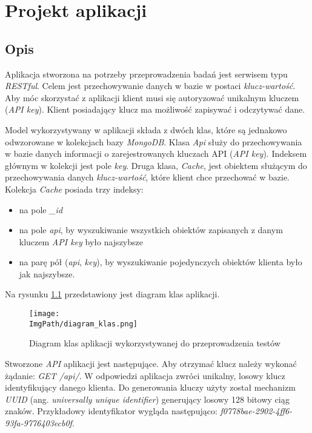 \chapter{Projekt aplikacji}
\section{Opis}
Aplikacja stworzona na potrzeby przeprowadzenia badań jest serwisem typu \textsl{RESTful}. Celem jest przechowywanie danych w bazie w postaci \textsl{klucz-wartość}. Aby móc skorzystać z aplikacji klient musi się autoryzować unikalnym kluczem (\textsl{API key}). Klient posiadający klucz ma możliwość zapisywać i odczytywać dane. 

Model wykorzystywany w aplikacji składa z dwóch klas, które są jednakowo odwzorowane w kolekcjach bazy \textsl{MongoDB}. Klasa \textsl{Api} służy do przechowywania w bazie danych informacji o zarejestrowanych kluczach API (\textsl{API key}). Indeksem głównym w kolekcji jest pole \textsl{key}.
Druga klasa, \textsl{Cache}, jest obiektem służącym do przechowywania danych \textsl{klucz-wartość}, które klient chce przechować w bazie. Kolekcja \textsl{Cache} posiada trzy indeksy:
\begin{itemize}
    \item na pole \textsl{\_id}
    \item na pole \textsl{api}, by wyszukiwanie wszystkich obiektów zapisanych z danym kluczem \textsl{API key} było najszybsze
    \item na parę pół (\textsl{api}, \textsl{key}), by wyszukiwanie pojedynczych obiektów klienta było jak najszybsze.
\end{itemize}
Na rysunku \ref{fig:class_diagram} przedstawiony jest diagram klas aplikacji. 
\begin{figure}[!ht]
\centering
\texttt{[image: \\ImgPath/diagram\_klas.png]}
\caption{Diagram klas aplikacji wykorzystywanej do przeprowadzenia testów}
\label{fig:class_diagram}
\end{figure}

Stworzone \textsl{API} aplikacji jest następujące. Aby otrzymać klucz należy wykonać żądanie: \textsl{GET /api/}. W odpowiedzi aplikacja zwróci unikalny, losowy klucz identyfikujący danego klienta. Do generowania kluczy użyty został mechanizm \textsl{UUID} (ang. \textsl{universally unique identifier}) generujący losowy 128 bitowy ciąg znaków. Przykładowy identyfikator wygląda następująco: \textsl{f0778bae-2902-4ff6-93fa-9776403ecb0f}.

